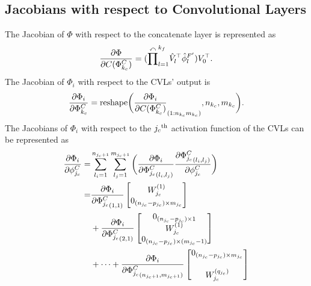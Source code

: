 \documentclass[letterpaper, 10 pt, conference]{ieeeconf}  %
\begin{document}
\subsection{Jacobians with respect to Convolutional Layers}\label{A. CNN Jacobian}

The Jacobian of $\Phi$ with respect to the concatenate layer is represented as
\begin{equation}
    {\partial \Phi\over\partial C(\Phi^C_{k_c})} = 
    (\overset{\curvearrowleft}\prod^{k_f}_{l=1} 
    {\hat V}^\top  _l {\hat\phi}_l^{F'}  ) V_0^\top  .
    \label{eq. dPhi/dC}
\end{equation}
The Jacobian of $\Phi_i$ with respect to the CVLs' output is
\begin{equation}
    {\partial \Phi_i\over\partial \Phi^C_{k_c}} = 
    \text{reshape}
    \bigg(
    {\partial \Phi_i\over\partial  C(\Phi^C_{k_c})}
    _{(1:n_{k_c}m_{k_c})}
    ,n_{k_c},m_{k_c}
    \bigg).
    \label{eq, dC/dPhi to dPhidPhi}    
\end{equation}
The Jacobians of $\Phi_i$ with respect to the $j_c\textsuperscript{th}$ activation function of the CVLs can be represented as
\begin{equation}
    \begin{aligned}
        {\partial \Phi_i\over\partial \phi^{C}_{j_c}} =&
        \sum_{l_i=1}^{n_{j_c+1}} \sum_{l_j=1}^{m_{j_c+1}} 
        \bigg(
            { \partial \Phi_i\over\partial {\Phi^C_{j_c}}_{(l_i,l_j)} }
            {\partial {\Phi^C_{j_c}}_{(l_i,l_j)}\over\partial \phi^{C}_{j_c}}
        \bigg)
        \\=&
        {\partial\Phi_i\over\partial {\Phi^C_{j_c}}_{(1,1)}}
        \begin{bmatrix}
            W_{{j_c}}^{(1)}\\ 0_{{(n_{{j_c}}}-p_{{j_c}})\times m_{{j_c}}}
        \end{bmatrix}
        \\&
        +
        {\partial\Phi_i\over\partial {\Phi^C_{j_c}}_{(2,1)}}
        \begin{bmatrix}
            0_{(n_{{j_c}}-p_{{j_c}})\times 1}\\ 
            W_{{j_c}}^{(1)}\\
            0_{({n_{{j_c}}}-p_{{j_c}})\times (m_{{j_c}}-1)}
        \end{bmatrix}
        \\
        &+\cdots
        +{\partial\Phi_i\over\partial {\Phi^C_{j_c}}_{(n_{j_c+1}, m_{j_c+1})}}
        \begin{bmatrix}
            0_{{(n_{{j_c}}}-p_{{j_c}})\times m_{{j_c}}}\\ \\ 
            W_{{j_c}}^{(q_{j_c})}
        \end{bmatrix}
        \end{aligned}
\end{equation}
\end{document}
